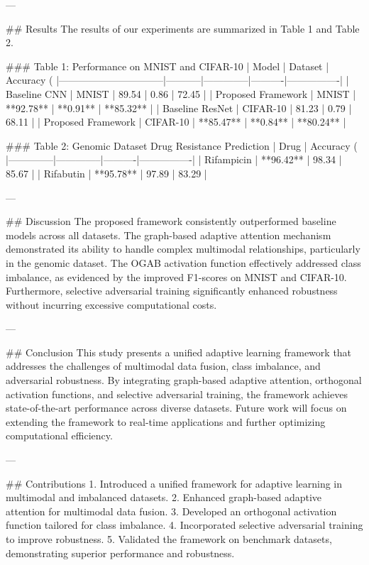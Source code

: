 ---

## Results
The results of our experiments are summarized in Table 1 and Table 2.

### Table 1: Performance on MNIST and CIFAR-10
| Model                          | Dataset   | Accuracy (%
|--------------------------------|-----------|--------------|----------|----------------|
| Baseline CNN                   | MNIST     | 89.54        | 0.86     | 72.45          |
| Proposed Framework             | MNIST     | **92.78**    | **0.91** | **85.32**      |
| Baseline ResNet                | CIFAR-10  | 81.23        | 0.79     | 68.11          |
| Proposed Framework             | CIFAR-10  | **85.47**    | **0.84** | **80.24**      |

### Table 2: Genomic Dataset Drug Resistance Prediction
| Drug         | Accuracy (%
|--------------|--------------|----------|----------------|
| Rifampicin   | **96.42**    | 98.34    | 85.67          |
| Rifabutin    | **95.78**    | 97.89    | 83.29          |

---

## Discussion
The proposed framework consistently outperformed baseline models across all datasets. The graph-based adaptive attention mechanism demonstrated its ability to handle complex multimodal relationships, particularly in the genomic dataset. The OGAB activation function effectively addressed class imbalance, as evidenced by the improved F1-scores on MNIST and CIFAR-10. Furthermore, selective adversarial training significantly enhanced robustness without incurring excessive computational costs.

---

## Conclusion
This study presents a unified adaptive learning framework that addresses the challenges of multimodal data fusion, class imbalance, and adversarial robustness. By integrating graph-based adaptive attention, orthogonal activation functions, and selective adversarial training, the framework achieves state-of-the-art performance across diverse datasets. Future work will focus on extending the framework to real-time applications and further optimizing computational efficiency.

---

## Contributions
1. Introduced a unified framework for adaptive learning in multimodal and imbalanced datasets.
2. Enhanced graph-based adaptive attention for multimodal data fusion.
3. Developed an orthogonal activation function tailored for class imbalance.
4. Incorporated selective adversarial training to improve robustness.
5. Validated the framework on benchmark datasets, demonstrating superior performance and robustness.